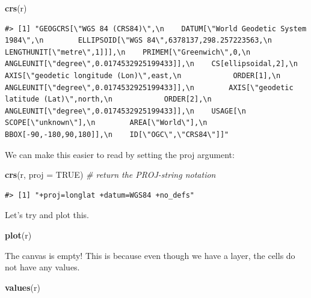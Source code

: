 \documentclass[
]{book}
\newenvironment{Shaded}{\begin{snugshade}}{\end{snugshade}}
\newcommand{\AttributeTok}[1]{\textcolor[rgb]{0.13,0.29,0.53}{#1}}
\newcommand{\CommentTok}[1]{\textcolor[rgb]{0.56,0.35,0.01}{\textit{#1}}}
\newcommand{\ConstantTok}[1]{\textcolor[rgb]{0.56,0.35,0.01}{#1}}
\newcommand{\FunctionTok}[1]{\textcolor[rgb]{0.13,0.29,0.53}{\textbf{#1}}}
\newcommand{\NormalTok}[1]{#1}
\begin{document}
\begin{Shaded}
\begin{Highlighting}[]
\FunctionTok{crs}\NormalTok{(r)}
\end{Highlighting}
\end{Shaded}

\begin{verbatim}
#> [1] "GEOGCRS[\"WGS 84 (CRS84)\",\n    DATUM[\"World Geodetic System 1984\",\n        ELLIPSOID[\"WGS 84\",6378137,298.257223563,\n            LENGTHUNIT[\"metre\",1]]],\n    PRIMEM[\"Greenwich\",0,\n        ANGLEUNIT[\"degree\",0.0174532925199433]],\n    CS[ellipsoidal,2],\n        AXIS[\"geodetic longitude (Lon)\",east,\n            ORDER[1],\n            ANGLEUNIT[\"degree\",0.0174532925199433]],\n        AXIS[\"geodetic latitude (Lat)\",north,\n            ORDER[2],\n            ANGLEUNIT[\"degree\",0.0174532925199433]],\n    USAGE[\n        SCOPE[\"unknown\"],\n        AREA[\"World\"],\n        BBOX[-90,-180,90,180]],\n    ID[\"OGC\",\"CRS84\"]]"
\end{verbatim}

We can make this easier to read by setting the proj argument:

\begin{Shaded}
\begin{Highlighting}[]
\FunctionTok{crs}\NormalTok{(r, }\AttributeTok{proj =} \ConstantTok{TRUE}\NormalTok{) }\CommentTok{\# return the PROJ{-}string notation}
\end{Highlighting}
\end{Shaded}

\begin{verbatim}
#> [1] "+proj=longlat +datum=WGS84 +no_defs"
\end{verbatim}

Let's try and plot this.

\begin{Shaded}
\begin{Highlighting}[]
\FunctionTok{plot}\NormalTok{(r)}
\end{Highlighting}
\end{Shaded}

The canvas is empty! This is because even though we have a layer, the cells do not have any values.

\begin{Shaded}
\begin{Highlighting}[]
\FunctionTok{values}\NormalTok{(r)}
\end{Highlighting}
\end{Shaded}
\end{document}

